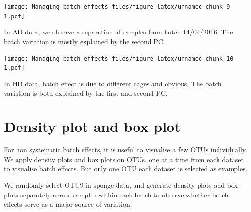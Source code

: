 \documentclass[]{book}
\newenvironment{Shaded}{\begin{snugshade}}{\end{snugshade}}
\newcommand{\KeywordTok}[1]{\textcolor[rgb]{0.13,0.29,0.53}{\textbf{#1}}}
\newcommand{\DataTypeTok}[1]{\textcolor[rgb]{0.13,0.29,0.53}{#1}}
\newcommand{\DecValTok}[1]{\textcolor[rgb]{0.00,0.00,0.81}{#1}}
\newcommand{\StringTok}[1]{\textcolor[rgb]{0.31,0.60,0.02}{#1}}
\newcommand{\CommentTok}[1]{\textcolor[rgb]{0.56,0.35,0.01}{\textit{#1}}}
\newcommand{\OperatorTok}[1]{\textcolor[rgb]{0.81,0.36,0.00}{\textbf{#1}}}
\newcommand{\NormalTok}[1]{#1}
\begin{document}
\texttt{[image: Managing\_batch\_effects\_files/figure-latex/unnamed-chunk-9-1.pdf]}

In AD data, we observe a separation of samples from batch 14/04/2016.
The batch variation is mostly explained by the second PC.

\begin{Shaded}
\end{Shaded}

\texttt{[image: Managing\_batch\_effects\_files/figure-latex/unnamed-chunk-10-1.pdf]}

In HD data, batch effect is due to different cages and obvious. The
batch variation is both explained by the first and second PC.

\section{Density plot and box plot}\label{density-plot-and-box-plot}

For non systematic batch effects, it is useful to visualise a few OTUs
individually. We apply density plots and box plots on OTUs, one at a
time from each dataset to visualise batch effects. But only one OTU each
dataset is selected as examples.

We randomly select OTU9 in sponge data, and generate density plots and
box plots separately across samples within each batch to observe whether
batch effects serve as a major source of variation.
\end{document}
